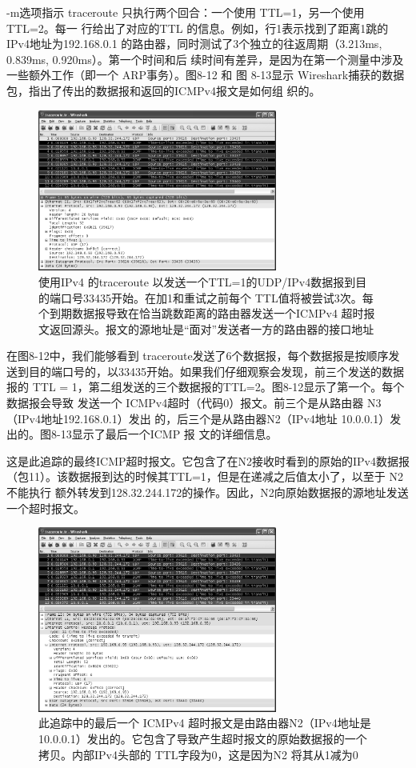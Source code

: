 -m选项指示 traceroute 只执行两个回合：一个使用 TTL=1，另一个使用TTL=2。每一
行给出了对应的TTL 的信息。例如，行1表示找到了距离1跳的IPv4地址为192.168.0.1
的路由器，同时测试了3个独立的往返周期（3.213ms, 0.839ms, 0.920ms）。第一个时间和后
续时间有差异，是因为在第一个测量中涉及一些额外工作（即一个 ARP事务）。图8-12 和
图 8-13显示 Wireshark捕获的数据包，指出了传出的数据报和返回的ICMPv4报文是如何组
织的。

\begin{figure}[!htb]
	\centering
	\includegraphics[width=0.7\textwidth]{imgs/8/8-12.png}
	\caption{使用IPv4 的traceroute 以发送一个TTL=1的UDP/IPv4数据报到目的端口号33435开始。在加1和重试之前每个 TTL值将被尝试3次。每个到期数据报导致在恰当跳数距离的路由器发送一个ICMPv4 超时报文返回源头。报文的源地址是“面对”发送者一方的路由器的接口地址}
\end{figure}

在图8-12中，我们能够看到 traceroute发送了6个数据报，每个数据报是按顺序发
送到目的端口号的，以33435开始。如果我们仔细观察会发现，前三个发送的数据报的
TTL = 1，第二组发送的三个数据报的TTL=2。图8-12显示了第一个。每个数据报会导致
发送一个 ICMPv4超时（代码0）报文。前三个是从路由器 N3（IPv4地址192.168.0.1）发出
的，后三个是从路由器N2（IPv4地址 10.0.0.1）发出的。图8-13显示了最后一个ICMP 报
文的详细信息。

这是此追踪的最终ICMP超时报文。它包含了在N2接收时看到的原始的IPv4数据报
（包11）。该数据报到达的时候其TTL=1，但是在递减之后值太小了，以至于 N2 不能执行
额外转发到128.32.244.172的操作。因此，N2向原始数据报的源地址发送一个超时报文。
\begin{figure}[!htb]
	\centering
	\includegraphics[width=0.7\textwidth]{imgs/8/8-13.png}
	\caption{此追踪中的最后一个 ICMPv4 超时报文是由路由器N2（IPv4地址是10.0.0.1）发出的。它包含了导致产生超时报文的原始数据报的一个拷贝。内部IPv4头部的 TTL字段为0，这是因为N2 将其从1减为0}
\end{figure}

